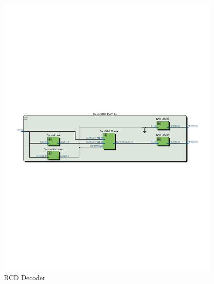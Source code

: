 \documentclass[13pt,a4paper]{report}
\begin{document}
\begin{figure}[H]
\centering
\includegraphics[scale=0.9, clip, trim={0cm 11cm 0cm 11.65cm}]{images/Exc2_BCDDisplay_RTL.pdf}
\caption*{BCD Decoder}
\end{figure}
\end{document}
